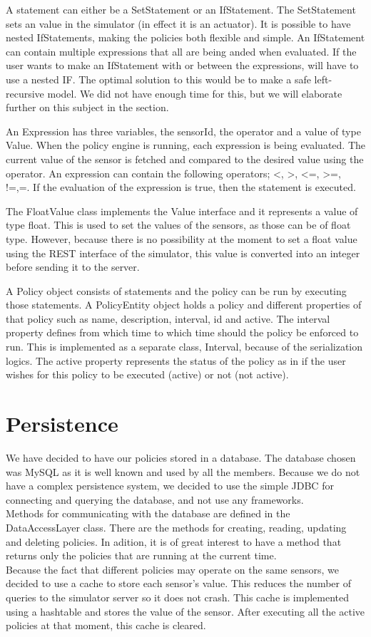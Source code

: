 A statement can either be a SetStatement or an IfStatement. The SetStatement sets an value in the simulator (in effect it is an actuator). It is possible to have nested IfStatements, making the policies both flexible and simple. An IfStatement can contain multiple expressions that all are being anded when evaluated. If the user wants to make an IfStatement with or between the expressions, will have to use a nested IF. The optimal solution to this would be to make a safe left-recursive model. We did not have enough time for this, but we will elaborate further on this subject in the  section. 

An Expression has three variables, the sensorId, the operator and a value of type Value. When the policy engine is running, each expression is being evaluated. The current value of the sensor is fetched and compared to the desired value using the operator. An expression can contain the following operators; <, >, <=, >=, !=,=. 
If the evaluation of the expression is true, then the statement is executed.

The FloatValue class implements the Value interface and it represents a value of type float. This is used to set the values of the sensors, as those can be of float type. However, because there is no possibility at the moment to set a float value using the REST interface of the simulator, this value is converted into an integer before sending it to the server.

A Policy object consists of statements and the policy can be run by executing those statements. A PolicyEntity object holds a policy and different properties of that policy such as name, description, interval, id and active. The interval property defines from which time to which time should the policy be enforced to run. This is implemented as a separate class, Interval, because of the serialization logics.  The active property represents the status of the policy as in if the user wishes for this policy to be executed (active) or not (not active).
\section{Persistence}
We have decided to have our policies stored in a database. The database chosen was MySQL as it is well known and used by all the members. Because we do not have a complex persistence system, we decided to use the simple JDBC for connecting and querying the database, and not use any frameworks. 
\\Methods for communicating with the database are defined in the DataAccessLayer class. There are the methods for creating, reading, updating and deleting policies. In adition, it is of great interest to have a method that returns only the policies that are running at the current time. 
\\Because the fact that different policies may operate on the same sensors, we decided to use a cache to store each sensor's value. This reduces the number of queries to the simulator server so it does not crash. This cache is implemented using a hashtable and stores the value of the sensor. After executing all the active policies at that moment, this cache is cleared. 
